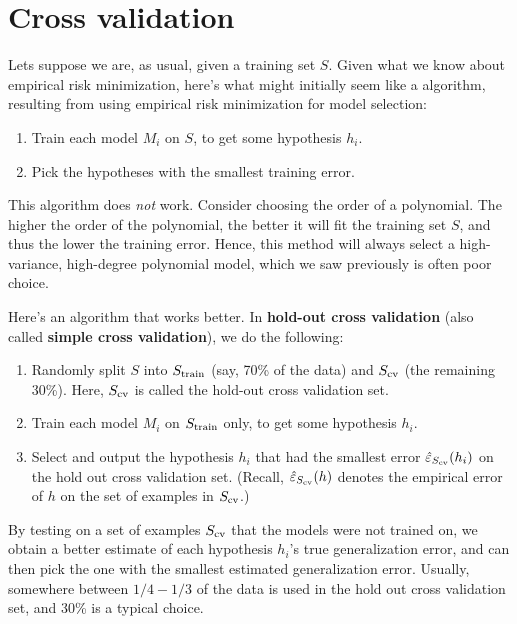 \documentclass{article}
\begin{document}
\section{Cross validation} 

Lets suppose we are, as usual, given a training set $S$.  
Given what we know about empirical risk minimization,
here's what might initially seem like a algorithm, 
resulting from using empirical risk minimization for model selection:
\begin{enumerate}
\item Train each model $M_i$ on $S$, to get some hypothesis $h_i$.
\item Pick the hypotheses with the smallest training error.
\end{enumerate}

This algorithm does \emph{not} work.  Consider choosing the order
of a polynomial.  The higher the order of the polynomial, the better
it will fit the training set $S$, and thus the lower the training error.
Hence, this method will always select a high-variance, high-degree polynomial
model, which we saw previously is often poor choice.

Here's an algorithm that works better.  In {\bf hold-out cross validation} 
(also called {\bf simple cross validation}),
we do the following:
\begin{enumerate}
\item Randomly split $S$ into $S_{\rm train}$ (say, 70\% of the data) and 
${S_{\rm cv}}$ (the remaining 30\%).  Here, ${S_{\rm cv}}$ is called the hold-out
cross validation set. 
\item Train each model $M_i$ on $S_{\rm train}$ only, to get some hypothesis $h_i$.
\item Select and output the hypothesis $h_i$ that had the smallest 
   error $\hat\varepsilon_{{S_{\rm cv}}}(h_i)$ on the hold out cross validation set.  
   (Recall, $\hat\varepsilon_{S_{\rm cv}}(h)$ denotes the empirical error of $h$ on the set
   of examples in ${S_{\rm cv}}$.) 
\end{enumerate}

By testing on a set of examples ${S_{\rm cv}}$ that the models were not trained on,
we obtain a better estimate of each hypothesis $h_i$'s true generalization
error, and can then pick the one with the smallest estimated generalization error. 
Usually, somewhere between $1/4 - 1/3$ of the data is used in the hold out
cross validation set, and 30\% is a typical choice. 
\end{document}
